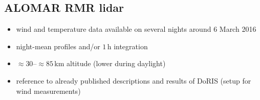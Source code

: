 \subsection{ALOMAR RMR lidar}

\begin{itemize}
  \item wind and temperature data available on several nights around 6 March 2016
  \item night-mean profiles and/or $1$\,h integration
  \item $\approx 30$--$\approx85$\,km altitude (lower during daylight)
  \medskip
  \item reference to already published descriptions and results of DoRIS (setup for wind measurements)
\end{itemize}